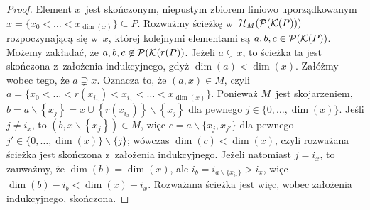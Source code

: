 \begin{proof}
Element $x$~jest skończonym, niepustym zbiorem liniowo uporządkowanym $x=\bigl\{x_0<\ldots<x_{\dim(x)}\bigr\}\subseteq P$. Rozważmy ścieżkę w~$\mathcal{H}_M(\mathcal{P}(\mathcal{K}(P)))$ rozpoczynającą się w~$x$, której kolejnymi elementami są $a,b,c\in\mathcal{P}(\mathcal{K}(P))$. Możemy zakładać, że $a,b,c\not\in\mathcal{P}(\mathcal{K}(r(P))$. Jeżeli $a\subsetneq x$, to ścieżka ta jest skończona z~założenia indukcyjnego, gdyż $\dim(a)<\dim(x)$. Załóżmy wobec tego, że $a\supsetneq x$. Oznacza to, że $(a,x)\in M$, czyli~$a=\bigl\{x_0<\ldots<r(x_{i_x})<x_{i_x}<\ldots<x_{\dim(x)}\bigr\}$. Ponieważ $M$~jest skojarzeniem, $b=a\smallsetminus\left\{x_j\right\}=x\cup\left\{r\left(x_{i_x}\right)\right\}\smallsetminus \left\{x_j\right\}$ dla pewnego $j\in\{0,\ldots,\dim(x)\}$. Jeśli $j\not=i_x$, to $\left(b,x\smallsetminus\left\{x_j\right\}\right)\in M$, więc $c=a\smallsetminus\bigl\{x_j,x_{j'}\bigr\}$ dla pewnego $j'\in \{0,\ldots,\dim(x)\}\smallsetminus\{j\}$; wówczas $\dim(c)<\dim(x)$, czyli rozważana ścieżka jest skończona z~założenia indukcyjnego. Jeżeli natomiast $j=i_x$, to zauważmy, że $\dim(b)=\dim(x)$, ale $i_b=i_{a\smallsetminus\{x_{i_x}\}}>i_x$, więc $\dim(b)-i_b<\dim(x)-i_x$. Rozważana ścieżka jest więc, wobec założenia indukcyjnego, skończona.
\end{proof}

